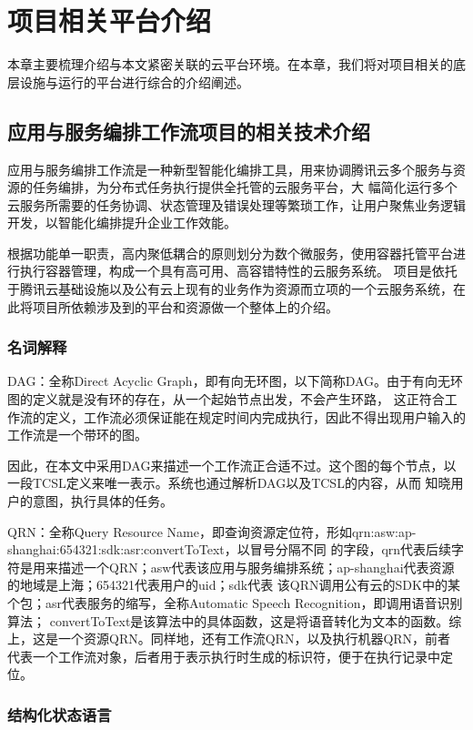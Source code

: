 
\chapter{项目相关平台介绍}
本章主要梳理介绍与本文紧密关联的云平台环境。在本章，我们将对项目相关的底层设施与运行的平台进行综合的介绍阐述。
\cite{ipacfteaom1}

\section{应用与服务编排工作流项目的相关技术介绍}
应用与服务编排工作流是一种新型智能化编排工具，用来协调腾讯云多个服务与资源的任务编排，为分布式任务执行提供全托管的云服务平台，大
幅简化运行多个云服务所需要的任务协调、状态管理及错误处理等繁琐工作，让用户聚焦业务逻辑开发，以智能化编排提升企业工作效能\cite{jydyyybp}。

根据功能单一职责，高内聚低耦合的原则划分为数个微服务，使用容器托管平台进行执行容器管理，构成一个具有高可用、高容错特性的云服务系统。
项目是依托于腾讯云基础设施以及公有云上现有的业务作为资源而立项的一个云服务系统，在此将项目所依赖涉及到的平台和资源做一个整体上的介绍。


\subsection{名词解释}

DAG：全称Direct Acyclic Graph，即有向无环图，以下简称DAG。由于有向无环图的定义就是没有环的存在，从一个起始节点出发，不会产生环路，
这正符合工作流的定义，工作流必须保证能在规定时间内完成执行，因此不得出现用户输入的工作流是一个带环的图。

因此，在本文中采用DAG来描述一个工作流正合适不过。这个图的每个节点，以一段TCSL定义来唯一表示。系统也通过解析DAG以及TCSL的内容，从而
知晓用户的意图，执行具体的任务。

QRN：全称Query Resource Name，即查询资源定位符，形如qrn:asw:ap-shanghai:654321:sdk:asr:convertToText，以冒号分隔不同
的字段，qrn代表后续字符是用来描述一个QRN；asw代表该应用与服务编排系统；ap-shanghai代表资源的地域是上海；654321代表用户的uid；sdk代表
该QRN调用公有云的SDK中的某个包；asr代表服务的缩写，全称Automatic Speech Recognition，即调用语音识别算法；
convertToText是该算法中的具体函数，这是将语音转化为文本的函数。综上，这是一个资源QRN。同样地，还有工作流QRN，以及执行机器QRN，前者
代表一个工作流对象，后者用于表示执行时生成的标识符，便于在执行记录中定位。


\subsection{结构化状态语言}

